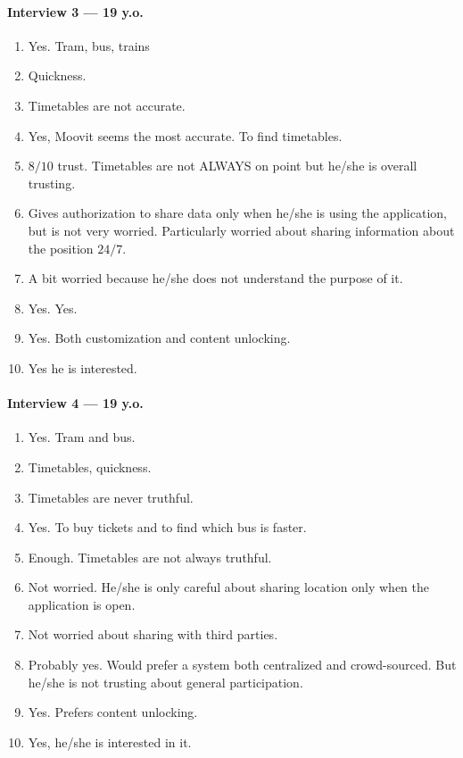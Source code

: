 \documentclass[a4paper, 11pt, twocolumn]{article}
\begin{document}
\paragraph*{Interview 3 --- 19 y.o.}
\begin{enumerate}
	\item Yes. Tram, bus, trains
	\item Quickness.
	\item Timetables are not accurate.
	\item Yes, Moovit seems the most accurate. To find timetables.
	\item $8/10$ trust. Timetables are not ALWAYS on point but he/she is overall trusting.
	\item Gives authorization to share data only when he/she is using the application, but is not very worried. Particularly worried about sharing information about the position $24/7$.
	\item A bit worried because he/she does not understand the purpose of it.
	\item Yes. Yes.
	\item Yes. Both customization and content unlocking.
	\item Yes he is interested.
\end{enumerate}

\paragraph*{Interview 4 --- 19 y.o.}
\begin{enumerate}
	\item Yes. Tram and bus.
	\item Timetables, quickness.
	\item Timetables are never truthful.
	\item Yes. To buy tickets and to find which bus is faster.
	\item Enough. Timetables are not always truthful.
	\item Not worried. He/she is only careful about sharing location only when the application is open.
	\item Not worried about sharing with third parties.
	\item Probably yes. Would prefer a system both centralized and crowd-sourced. But he/she is not trusting about general participation.
	\item Yes. Prefers content unlocking.
	\item Yes, he/she is interested in it.
\end{enumerate}
\end{document}
